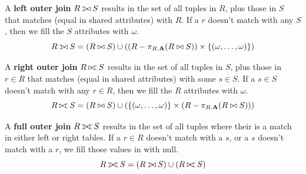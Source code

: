     \begin{definition}
      \label{def:left-outer-join}
      A \textbf{left outer join} $R \lojoin S$ results in the set of all tuples in $R$, plus those in $S$ that matches (equal in shared attributes) with $R$. If a $r$ doesn't match with any $S$, then we fill the $S$ attributes with $\omega$. 
      \begin{equation}
        R \lojoin S = (R \bowtie S) \cup ( (R - \pi_{R.\mathbf{A}} (R \bowtie S)) \times \{(\omega, \ldots, \omega)\})
      \end{equation}
    \end{definition} 

    \begin{definition}
      \label{def:right-outer-join}
      A \textbf{right outer join} $R \rojoin S$ results in the set of all tuples in $S$, plus those in $r \in R$ that matches (equal in shared attributes) with some $s \in S$. If a $s \in S$ doesn't match with any $r \in R$, then we fill the $R$ attributes with $\omega$. 
      \begin{equation}
        R \rojoin S = (R \bowtie S) \cup ( \{(\omega, \ldots, \omega)\} \times (R - \pi_{R.\mathbf{A}} (R \bowtie S)))
      \end{equation}
    \end{definition}

    \begin{definition}
      \label{def:full-outer-join}
      A \textbf{full outer join} $R \fojoin S$ results in the set of all tuples where their is a match in either left or right tables. If a $r \in R$ doesn't match with a $s$, or a $s$ doesn't match with a $r$, we fill those values in with null. 
      \begin{equation}
        R \fojoin S = (R \lojoin S) \cup (R \rojoin S)
      \end{equation}
    \end{definition}

